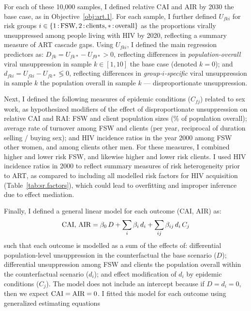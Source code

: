 \par
For each of these 10,000 samples, I defined
relative CAI and AIR by 2030 \vs the base case, as in Objective~\ref{obj:art.1}.
For each sample, I further defined
$U_{fki}$ for risk groups $i \in \{1{\,:\,}\textnormal{FSW}, 2{\,:\,}\textnormal{clients}, *{\,:\,}\textnormal{overall}\}$
as the proportions virally unsuppressed among people living with HIV by 2020,
reflecting a summary measure of ART cascade gaps.
Using $U_{fki}$, I defined the main regression predictors as:
$D_{fk} = U_{fk*} - U_{f0*} > 0$, reflecting differences in
\emph{population-overall} viral unsuppression in sample $k \in [1,10]$
\vs the base case (denoted $k = 0$); and
$d_{fki} = U_{fki} - U_{fk*} \lessgtr 0$, reflecting differences in
\emph{group-$i$-specific} viral unsuppression in sample $k$
\vs the population overall in sample $k$ --- \ie disproportionate unsuppression.
\par
Next, I defined the following measures of epidemic conditions ($C_{fj}$) related to sex work,
as hypothesized modifiers of the effect of disproportionate unsuppression on relative CAI and RAI:
FSW and client population sizes (\% of population overall);
average rate of turnover among FSW and clients
(per year, reciprocal of duration selling / buying sex); and
HIV incidence ratios in the year 2000 among FSW \vs other women, and among clients \vs other men.
For these measures, I combined higher and lower risk FSW,
and likewise higher and lower risk clients.
I used HIV incidence ratios in 2000 to reflect
summary measures of risk heterogeneity prior to ART,
as compared to including all modelled risk factors
for HIV acquisition (\eg Table~\ref{tab:sr.factors}),
which could lead to overfitting and improper inference due to effect mediation.
\par
Finally, I defined a general linear model for each outcome (CAI, AIR) as:
\begin{equation}\label{eq:art.glm}
  \textnormal{CAI, AIR} = \beta_0\,D
                 + \sum_i \beta_i\,d_i
                 + \sum_{ij} \beta_{ij}\,d_i\,C_j
\end{equation}
such that each outcome is modelled as a sum of the effects of:
differential population-level unsuppression in the counterfactual
\vs the base scenario ($D$);
differential unsuppression among FSW and clients
\vs the population overall within the counterfactual scenario ($d_i$); and
effect modification of $d_i$ by epidemic conditions ($C_j$).
The model does not include an intercept because if $D = d_i = 0$,
then we expect $\textnormal{CAI} = \textnormal{AIR} = 0$.
I fitted this model for each outcome using generalized estimating equations \cite{Halekoh2006}
